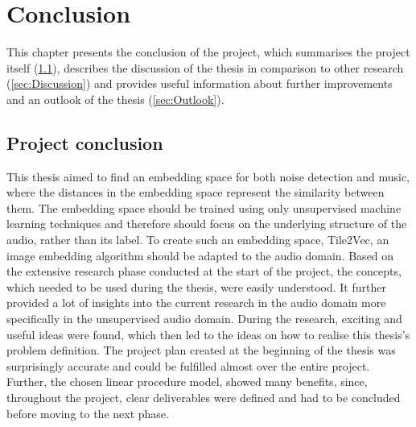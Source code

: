 \chapter{Conclusion}
\label{ch:Conclusion}
This chapter presents the conclusion of the project, which summarises the project itself (\ref{sec:Project-Conclusion}), describes the discussion of the thesis in comparison to other research (\ref{sec:Discussion}) and provides useful information about further improvements and an outlook of the thesis (\ref{sec:Outlook}).

\section{Project conclusion}
\label{sec:Project-Conclusion}
This thesis aimed to find an embedding space for both noise detection and music, where the distances in the embedding space represent the similarity between them. The embedding space should be trained using only unsupervised machine learning techniques and therefore should focus on the underlying structure of the audio, rather than its label. To create such an embedding space, Tile2Vec, an image embedding algorithm should be adapted to the audio domain. 
\newline
\newline
Based on the extensive research phase conducted at the start of the project, the concepts, which needed to be used during the thesis, were easily understood. It further provided a lot of insights into the current research in the audio domain more specifically in the unsupervised audio domain. During the research, exciting and useful ideas were found, which then led to the ideas on how to realise this thesis's problem definition. The project plan created at the beginning of the thesis was surprisingly accurate and could be fulfilled almost over the entire project. Further, the chosen linear procedure model, showed many benefits, since, throughout the project, clear deliverables were defined and had to be concluded before moving to the next phase. 
\newline
\newline
